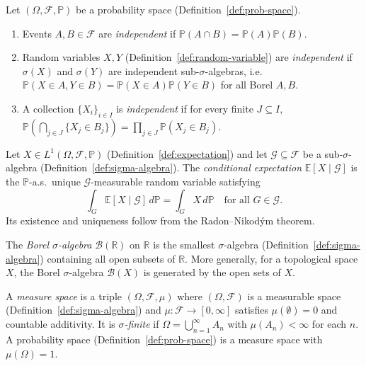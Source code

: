 \begin{definition}[Independence]
\label{def:independence}
Let $(\Omega, \mathcal{F}, \mathbb{P})$ be a probability space (Definition~\ref{def:prob-space}).
\begin{enumerate}
  \item Events $A, B \in \mathcal{F}$ are \emph{independent} if $\mathbb{P}(A \cap B) = \mathbb{P}(A)\mathbb{P}(B)$.
  \item Random variables $X, Y$ (Definition~\ref{def:random-variable}) are \emph{independent} if $\sigma(X)$ and $\sigma(Y)$ are independent sub-$\sigma$-algebras, i.e.\ $\mathbb{P}(X \in A, Y \in B) = \mathbb{P}(X \in A)\mathbb{P}(Y \in B)$ for all Borel $A, B$.
  \item A collection $\{X_i\}_{i \in I}$ is \emph{independent} if for every finite $J \subseteq I$, $\mathbb{P}(\bigcap_{j \in J} \{X_j \in B_j\}) = \prod_{j \in J} \mathbb{P}(X_j \in B_j)$.
\end{enumerate}
\end{definition}

\begin{definition}
\label{def:conditional-expectation}
Let $X \in L^1(\Omega, \mathcal{F}, \mathbb{P})$ (Definition~\ref{def:expectation}) and let $\mathcal{G} \subseteq \mathcal{F}$ be a sub-$\sigma$-algebra (Definition~\ref{def:sigma-algebra}).
The \emph{conditional expectation} $\mathbb{E}[X \mid \mathcal{G}]$ is the $\mathbb{P}$-a.s.\ unique $\mathcal{G}$-measurable random variable satisfying
\[
  \int_G \mathbb{E}[X \mid \mathcal{G}]\, d\mathbb{P} = \int_G X\, d\mathbb{P} \quad \text{for all } G \in \mathcal{G}.
\]
Its existence and uniqueness follow from the Radon--Nikod\'{y}m theorem.
\end{definition}

\begin{definition}
\label{def:borel}
The \emph{Borel $\sigma$-algebra} $\mathcal{B}(\mathbb{R})$ on $\mathbb{R}$ is the smallest $\sigma$-algebra (Definition~\ref{def:sigma-algebra}) containing all open subsets of $\mathbb{R}$.
More generally, for a topological space $X$, the Borel $\sigma$-algebra $\mathcal{B}(X)$ is generated by the open sets of $X$.
\end{definition}

\begin{definition}
\label{def:measure-space}
A \emph{measure space} is a triple $(\Omega, \mathcal{F}, \mu)$ where $(\Omega, \mathcal{F})$ is a measurable space (Definition~\ref{def:sigma-algebra}) and $\mu : \mathcal{F} \to [0, \infty]$ satisfies $\mu(\emptyset) = 0$ and countable additivity.
It is \emph{$\sigma$-finite} if $\Omega = \bigcup_{n=1}^\infty A_n$ with $\mu(A_n) < \infty$ for each $n$.
A probability space (Definition~\ref{def:prob-space}) is a measure space with $\mu(\Omega) = 1$.
\end{definition}

